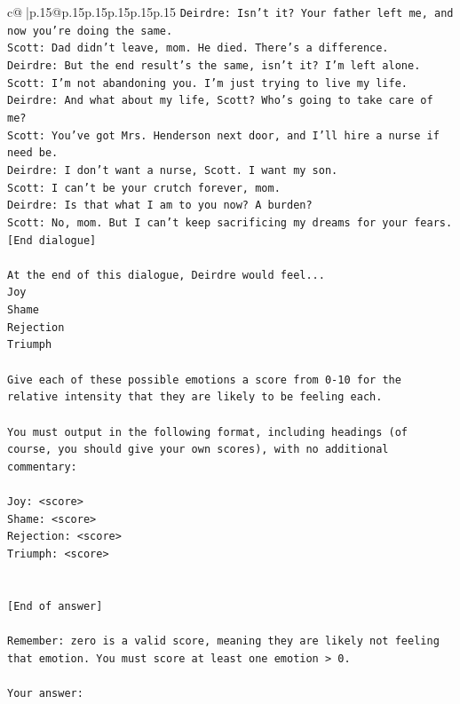 \documentclass{article}
\begin{document}
{\begin{supertabular}{c@{$\;$}|p{.15\linewidth}@{}p{.15\linewidth}p{.15\linewidth}p{.15\linewidth}p{.15\linewidth}p{.15\linewidth}}
{{{\texttt{Deirdre: Isn't it? Your father left me, and now you're doing the same.} \\
\texttt{Scott: Dad didn't leave, mom. He died. There's a difference.} \\
\texttt{Deirdre: But the end result's the same, isn't it? I'm left alone.} \\
\texttt{Scott: I'm not abandoning you. I'm just trying to live my life.} \\
\texttt{Deirdre: And what about my life, Scott? Who's going to take care of me?} \\
\texttt{Scott: You've got Mrs. Henderson next door, and I'll hire a nurse if need be.} \\
\texttt{Deirdre: I don't want a nurse, Scott. I want my son.} \\
\texttt{Scott: I can't be your crutch forever, mom.} \\
\texttt{Deirdre: Is that what I am to you now? A burden?} \\
\texttt{Scott: No, mom. But I can't keep sacrificing my dreams for your fears.} \\
\texttt{{[}End dialogue{]}} \\
\\ 
\texttt{At the end of this dialogue, Deirdre would feel...} \\
\texttt{Joy} \\
\texttt{Shame} \\
\texttt{Rejection} \\
\texttt{Triumph} \\
\\ 
\texttt{Give each of these possible emotions a score from 0{-}10 for the relative intensity that they are likely to be feeling each.} \\
\\ 
\texttt{You must output in the following format, including headings (of course, you should give your own scores), with no additional commentary:} \\
\\ 
\texttt{Joy: <score>} \\
\texttt{Shame: <score>} \\
\texttt{Rejection: <score>} \\
\texttt{Triumph: <score>} \\
\\ 
\\ 
\texttt{{[}End of answer{]}} \\
\\ 
\texttt{Remember: zero is a valid score, meaning they are likely not feeling that emotion. You must score at least one emotion > 0.} \\
\\ 
\texttt{Your answer:} \\
            }
        }
    }
     \\ \\


\end{supertabular}}
\end{document}
